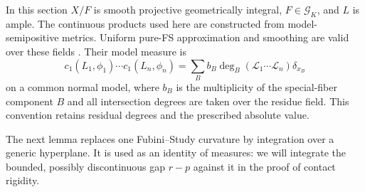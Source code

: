 \documentclass[11pt,reqno]{amsart}
\theoremstyle{definition}
\newtheorem{definition}[theorem]{Definition}
\theoremstyle{remark}
\numberwithin{equation}{section}
\begin{document}
In this section \(X/F\) is smooth projective geometrically integral,
\(F\in\mathcal G_K\), and \(L\) is ample. The continuous products
used here are constructed from model-semipositive metrics. Uniform
pure-FS approximation and smoothing are valid over these fields
\cite[Corollary~7.6 and Theorems~7.8, 7.14]{BE}. Their model measure is
\begin{equation}\label{eq:native-model-measure}
 c_1(L_1,\phi_1)\cdots c_1(L_n,\phi_n)
 =\sum_B b_B\deg_B(\mathcal L_1\cdots\mathcal L_n)\delta_{x_B}
\end{equation}
on a common normal model, where \(b_B\) is the multiplicity of the
special-fiber component \(B\) and all intersection degrees are taken
over the residue field. This convention retains residual degrees
and the prescribed absolute value.


The next lemma replaces one Fubini--Study curvature by integration
over a generic hyperplane. It is used as an identity of measures:
we will integrate the bounded, possibly discontinuous gap $r-p$
against it in the proof of contact rigidity.
\end{document}
